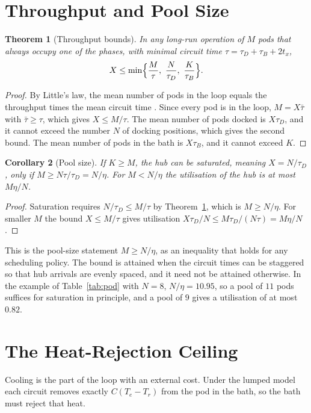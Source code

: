 \documentclass[11pt,openany]{book}
\theoremstyle{plain}
\newtheorem{theorem}{Theorem}[chapter]
\newtheorem{corollary}[theorem]{Corollary}
\theoremstyle{definition}
\theoremstyle{remark}
\begin{document}
\section{Throughput and Pool Size}

\begin{theorem}[Throughput bounds]
\label{thm:throughput}
In any long-run operation of $M$ pods that always occupy one of the phases, with minimal circuit time $\tau=\tau_D+\tau_B+2t_x$,
\[
X\le\min\Bigl\{\frac M\tau,\ \frac N{\tau_D},\ \frac K{\tau_B}\Bigr\}.
\]
\end{theorem}
\begin{proof}
By Little's law, the mean number of pods in the loop equals the throughput times the mean circuit time \cite{denning}. Since every pod is in the loop, $M=X\bar\tau$ with $\bar\tau\ge\tau$, which gives $X\le M/\tau$. The mean number of pods docked is $X\tau_D$, and it cannot exceed the number $N$ of docking positions, which gives the second bound. The mean number of pods in the bath is $X\tau_B$, and it cannot exceed $K$.
\end{proof}

\begin{corollary}[Pool size]
\label{cor:pool}
If $K\ge M$, the hub can be saturated, meaning $X=N/\tau_D$, only if $M\ge N\tau/\tau_D=N/\eta$. For $M<N/\eta$ the utilisation of the hub is at most $M\eta/N$.
\end{corollary}
\begin{proof}
Saturation requires $N/\tau_D\le M/\tau$ by Theorem~\ref{thm:throughput}, which is $M\ge N/\eta$. For smaller $M$ the bound $X\le M/\tau$ gives utilisation $X\tau_D/N\le M\tau_D/(N\tau)=M\eta/N$.
\end{proof}

This is the pool-size statement $M\ge N/\eta$, as an inequality that holds for any scheduling policy. The bound is attained when the circuit times can be staggered so that hub arrivals are evenly spaced, and it need not be attained otherwise. In the example of Table~\ref{tab:pod} with $N=8$, $N/\eta=10.95$, so a pool of $11$ pods suffices for saturation in principle, and a pool of $9$ gives a utilisation of at most $0.82$.

\section{The Heat-Rejection Ceiling}

Cooling is the part of the loop with an external cost. Under the lumped model each circuit removes exactly $C(T_e-T_r)$ from the pod in the bath, so the bath must reject that heat.
\end{document}
